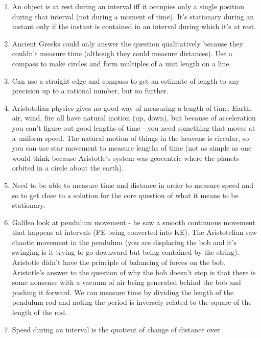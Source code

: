 \documentclass[12pt]{article}
\theoremstyle{definition}
\begin{document}
\begin{enumerate}
    \itemsep0em 
    \item  An object is at rest during an interval iff it occupies only a
        single position during that interval (not during a moment of time).
        It's stationary during an instant only if the instant is contained in
        an interval during which it's at rest. 
    \item Ancient Greeks could only answer the question qualitatively because
        they couldn't measure time (although they could measure distances). Use
        a compass to make circles and form multiples of a unit length on a
        line.
    \item Can use a straight edge and compass to get an estimate of length to
        any precision up to a rational number, but no further.
    \item Aristotelian physics gives no good way of measuring a length of time.
        Earth, air, wind, fire all have natural motion (up, down), but because
        of acceleration you can't figure out good lengths of time - you need
        something that moves at a uniform speed. The natural motion of things
        in the heavens is circular, so you can use star movement to measure
        lengths of time (not as simple as one would think because Aristotle's
        system was geocentric where the planets orbited in a circle about the
        earth).
    \item
        Need to be able to measure time and distance in order to measure speed
        and so to get close to a solution for the core question of what it
        means to be stationary.
    \item
        Galileo look at pendulum movement - he saw a smooth continuous movement
        that happens at intervals (PE being converted into KE). The
        Aristotelian saw chaotic movement in the pendulum (you are displacing
        the bob and it's swinging is it trying to go downward but being
        contained by the string). Aristotle didn't have the principle of
        balancing of forces on the bob. Aristotle's answer to the question of
        why the bob doesn't stop is that there is some nonsense with a vacuum
        of air being generated behind the bob and pushing it forward. We can
        measure time by dividing the length of the pendulum rod and noting the
        period is inversely related to the square of the length of the rod.
    \item
        Speed during an interval is the quotient of change of distance over

\end{enumerate}
\end{document}
